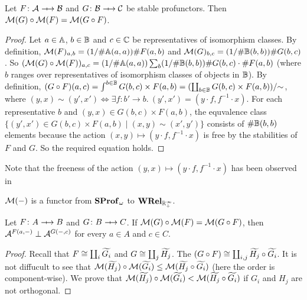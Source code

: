 \begin{theorem}
    Let \( F \colon \creed \profarrow \creedb \) and \( G \colon \creedb \profarrow \creedc \) be stable profunctors.
    Then \( \mathcal{M}({G}) \circ \mathcal{M}({F}) = \mathcal{M}({G \circ F}) \).
\end{theorem}
\begin{proof}
    Let \( a \in \mathbb{A} \), \( b \in \mathbb{B} \) and \( c \in \mathbb{C} \) be representatives of isomorphism classes.
    By definition, \( \mathcal{M}({F})_{a,b} = (1/\#\mathbb{A}(a,a)) \# F(a,b) \) and \( \mathcal{M}({G})_{b,c} = (1/\#\mathbb{B}(b,b)) \#G(b,c) \).
    So \( (\mathcal{M}({G}) \circ \mathcal{M}({F}))_{a,c} = (1/\#\mathbb{A}(a,a)) \sum_{b} (1/\#\mathbb{B}(b,b)) \# G(b,c) \cdot \# F(a,b) \) (where \( b \) ranges over representatives of isomorphism classes of objects in \( \mathbb{B} \)).
    By definition, \( (G \circ F)(a,c) = \int^{b \in \mathbb{B}} G(b,c) \times F(a,b) = (\coprod_{b \in \mathbb{B}} G(b,c) \times F(a,b)) / {\sim} \), where \( (y,x) \sim (y', x') \Longleftrightarrow \exists f \colon b' \to b.\ (y', x') = (y \cdot f, f^{-1} \cdot x) \).
    For each representative \( b \) and \( (y,x) \in G(b,c) \times F(a,b) \), the equvalence class \( \{ (y', x') \in G(b,c) \times F(a,b) \mid (x,y) \sim (x', y') \} \) consists of \( \# \mathbb{B}(b,b) \) elements because the action \( (x,y) \mapsto (y \cdot f, f^{-1} \cdot x) \) is free by the stabilities of \( F \) and \( G \).
    So the required equation holds.
\end{proof}
Note that the freeness of the action \( (y,x) \mapsto (y \cdot f, f^{-1} \cdot x) \) has been observed in \cite{Fiore2024}

\begin{corollary}
    \( \mathcal{M}({{-}}) \) is a functor from \( \mathbf{SProf}_\omega \) to \( \mathbf{WRel}_{\mathbb{R}_+^\infty} \).
\end{corollary}

\begin{theorem}
    Let \( F \colon A \profarrow B \) and \( G \colon B \profarrow C \).
    If \( \mathcal{M}({G}) \circ \mathcal{M}({F}) = \mathcal{M}({G \circ F}) \), then \( \mathcal{A}^{F(a, {-})} \mathrel{\bot} \mathcal{A}^{G({-}, c)} \) for every \( a \in A \) and \( c \in C \).
\end{theorem}
\begin{proof}
    Recall that \( F \cong \coprod_i \widetilde{G_i} \) and \( G \cong \coprod_j \widetilde{H_j} \).
    The \( (G \circ F) \cong \coprod_{i,j} \widetilde{H_j} \circ \widetilde{G_i} \).
    It is not diffucult to see that \( \mathcal{M}({\widetilde{H_j}}) \circ \mathcal{M}({\widetilde{G_i}}) \le \mathcal{M}({\widetilde{H_j} \circ \widetilde{G_i}}) \) (here the order is component-wise).
    We prove that \( \mathcal{M}({\widetilde{H_j}}) \circ \mathcal{M}({\widetilde{G_i}}) < \mathcal{M}({\widetilde{H_j} \circ \widetilde{G_i}}) \) if \( G_i \) and \( H_j \) are not orthogonal.

\end{proof}

